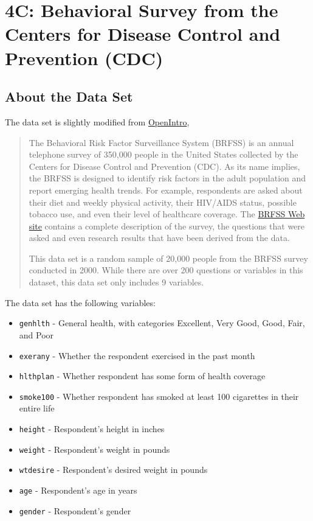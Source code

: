 \documentclass[
  letterpaper,
  DIV=11,
  numbers=noendperiod]{scrreprt}
\begin{document}
\chapter{4C: Behavioral Survey from the Centers for Disease Control and
Prevention
(CDC)}\label{c-behavioral-survey-from-the-centers-for-disease-control-and-prevention-cdc}

\section{About the Data Set}\label{about-the-data-set}

The data set is slightly modified from
\href{https://www.openintro.org/book/statdata/?data=cdc}{OpenIntro},

\begin{quote}
The Behavioral Risk Factor Surveillance System (BRFSS) is an annual
telephone survey of 350,000 people in the United States collected by the
Centers for Disease Control and Prevention (CDC). As its name implies,
the BRFSS is designed to identify risk factors in the adult population
and report emerging health trends. For example, respondents are asked
about their diet and weekly physical activity, their HIV/AIDS status,
possible tobacco use, and even their level of healthcare coverage. The
\href{https://www.openintro.org/redirect.php?go=cdc_data_brfss&referrer=data_set_page}{BRFSS
Web site} contains a complete description of the survey, the questions
that were asked and even research results that have been derived from
the data.

This data set is a random sample of 20,000 people from the BRFSS survey
conducted in 2000. While there are over 200 questions or variables in
this dataset, this data set only includes 9 variables.
\end{quote}

The data set has the following variables:

\begin{itemize}
\item
  \texttt{genhlth} - General health, with categories Excellent, Very
  Good, Good, Fair, and Poor
\item
  \texttt{exerany} - Whether the respondent exercised in the past month
\item
  \texttt{hlthplan} - Whether respondent has some form of health
  coverage
\item
  \texttt{smoke100} - Whether respondent has smoked at least 100
  cigarettes in their entire life
\item
  \texttt{height} - Respondent's height in inches
\item
  \texttt{weight} - Respondent's weight in pounds
\item
  \texttt{wtdesire} - Respondent's desired weight in pounds
\item
  \texttt{age} - Respondent's age in years
\item
  \texttt{gender} - Respondent's gender
\end{itemize}
\end{document}

